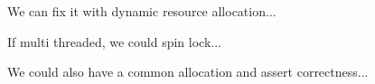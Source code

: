 \documentclass[xcolor=svgnames]{beamer}
\begin{document}


{%
%
\begin{frame}{\subsecname}
    \begin{minipage}{\columnwidth}
        We can fix it with dynamic resource allocation...
    \end{minipage}
\end{frame}
}



{%
%
\begin{frame}{\subsecname}
    \begin{minipage}{\columnwidth}
        If multi threaded, we could spin lock...
    \end{minipage}
\end{frame}
}



{%
%
\begin{frame}{\subsecname}
    \begin{minipage}{\columnwidth}
        We could also have a common allocation and assert correctness...
    \end{minipage}
\end{frame}
}


\end{document}

